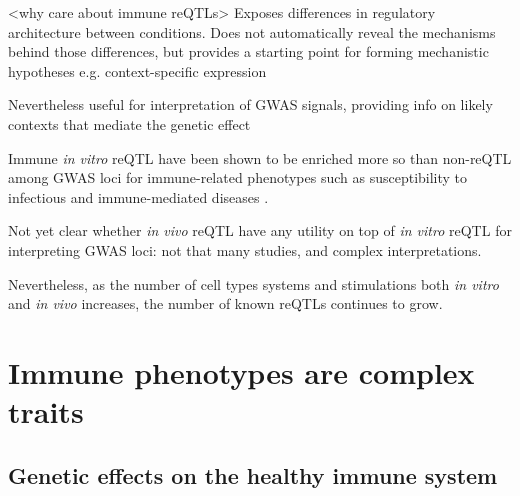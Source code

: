 \begin{outline}
\1 <why care about immune reQTLs>
    \2 Exposes differences in regulatory architecture between conditions. 
    \2 Does not automatically reveal the mechanisms behind those differences, but provides a starting point for forming mechanistic hypotheses e.g. context-specific expression

    \2 Nevertheless useful for interpretation of GWAS signals, providing info on likely contexts that mediate the genetic effect

    \2 Immune \textit{in vitro} \gls{reQTL} have been shown to be enriched more so than non-\gls{reQTL} among GWAS loci for immune-related phenotypes such as
    susceptibility to infectious \autocite{barreiro2012DecipheringGeneticArchitecture,manry2017DecipheringGeneticControl}
    and immune-mediated diseases \autocite{manry2017DecipheringGeneticControl,kim-hellmuth2017GeneticRegulatoryEffects}.


    \2 Not yet clear whether \textit{in vivo} reQTL have any utility on top of \textit{in vitro} reQTL for interpreting GWAS loci: not that many studies, and complex interpretations.

    \2 Nevertheless, as the number of cell types systems and stimulations both \textit{in vitro} and \textit{in vivo} increases, the number of known reQTLs continues to grow.

\section{Immune phenotypes are complex traits}

\subsection{Genetic effects on the healthy immune system}


\end{outline}
